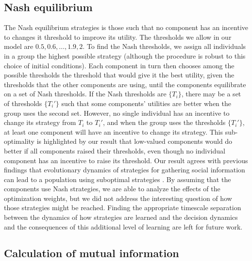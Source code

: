 \documentclass{article}
\begin{document}
\subsection{Nash equilibrium}
The Nash equilibrium strategies is those such that no component has an incentive to changes it threshold to improve its utility. The thresholds we allow in our model are $0.5,0.6,\dots,1.9,2$. To find the Nash thresholds, we assign all individuals in a group the highest possible strategy (although the procedure is robust to this choice of initial conditions). Each component in turn then chooses among the possible thresholds the threshold that would give it the best utility, given the thresholds that the other components are using, until the components equilibrate on a set of Nash thresholds. If the Nash thresholds are $\{T_i\}$, there may be a set of thresholds $\{T_i'\}$ such that some components' utilities are better when the group uses the second set. However, no single individual has an incentive to change its strategy from $T_i$ to $T_i'$, and when the group uses the thresholds $\{T_i'\}$, at least one component will have an incentive to change its strategy. This sub-optimality is highlighted by our result that low-valued components would do better if all components raised their thresholds, even though no individual component has an incentive to raise its threshold. Our result agrees with previous findings that evolutionary dynamics of strategies for gathering social information can lead to a population using suboptimal strategies \cite{Torney:2015fk}.  By assuming that the components use Nash strategies, we are able to analyze the effects of the optimization weights, but we did not address the interesting question of how those strategies might be reached. Finding the appropriate timescale separation between the dynamics of how strategies are learned and the decision dynamics and the consequences of this additional level of learning are left for future work. 

\subsection{Calculation of mutual information }
\end{document}
